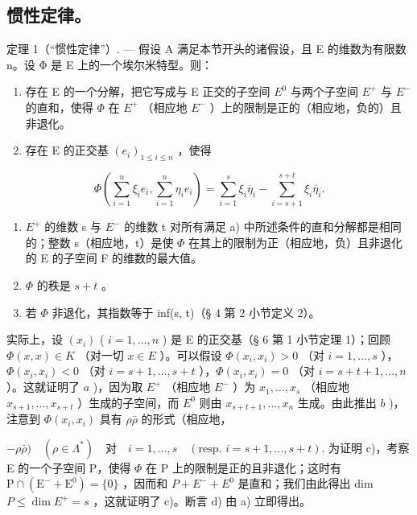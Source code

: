 \subsection{惯性定律。}

定理 1（“惯性定律”）. --- 假设 A 满足本节开头的诸假设，且 E 的维数为有限数 n。设 Φ 是 E 上的一个埃尔米特型。则：

\begin{enumerate}
\def\labelenumi{\alph{enumi})}
\item
  存在 E 的一个分解，把它写成与 E 正交的子空间 \(E^{0}\) 与两个子空间 \(E^{+}\) 与 \(E^{-}\) 的直和，使得 \(\Phi\) 在 \(E^{+}\) （相应地 \(E^{-}\) ）上的限制是正的（相应地，负的）且非退化。
\item
  存在 E 的正交基 \((e_i)_{1\leqslant i\leqslant n}\) ，使得
\end{enumerate}

\[
\Phi (\sum_ {i = 1} ^ {n} \xi_ {i} e _ {i}, \sum_ {i = 1} ^ {n} \eta_ {i} e _ {i}) = \sum_ {i = 1} ^ {s} \xi_ {i} \overline {{\eta}} _ {i} - \sum_ {i = s + 1} ^ {s + t} \xi_ {i} \overline {{\eta}} _ {i}.\tag{2}
\]

\begin{enumerate}
\def\labelenumi{\alph{enumi})}
\setcounter{enumi}{2}
\item
  \(E^{+}\) 的维数 s 与 \(E^{-}\) 的维数 t 对所有满足 a) 中所述条件的直和分解都是相同的；整数 s（相应地，t）是使 \(\Phi\) 在其上的限制为正（相应地，负）且非退化的 E 的子空间 F 的维数的最大值。
\item
  \(\Phi\) 的秩是 \(s + t\) 。
\item
  若 \(\Phi\) 非退化，其指数等于 inf(s, t)（§ 4 第 2 小节定义 2）。
\end{enumerate}

实际上，设 \((x_{i})\) ( \(i = 1, \ldots, n\) ) 是 E 的正交基（§ 6 第 1 小节定理 1）；回顾 \(\Phi(x, x) \in K\) （对一切 \(x \in E\) ）。可以假设 \(\Phi(x_{i}, x_{i}) > 0\) （对 \(i = 1, \ldots, s\) ），\(\Phi(x_{i}, x_{i}) < 0\) （对 \(i = s + 1, \ldots, s + t\) ），\(\Phi(x_{i}, x_{i}) = 0\) （对 \(i = s + t + 1, \ldots, n\) ）。这就证明了 \(a\) )，因为取 \(E^{+}\) （相应地 \(E^{-}\) ）为 \(x_{1}, \ldots, x_{s}\) （相应地 \(x_{s+1}, \ldots, x_{s+t}\) ）生成的子空间，而 \(E^{0}\) 则由 \(x_{s+t+1}, \ldots, x_{n}\) 生成。由此推出 \(b\) )，注意到 \(\Phi(x_{i}, x_{i})\) 具有 \(\rho\bar{\rho}\) 的形式（相应地，

\(-\rho\bar{\rho}) \quad (\rho\in\Lambda^{*}) \quad \text{对} \quad i=1,\ldots,s \quad (\text{resp. } i=s+1,\ldots,s+t).\) 为证明 c)，考察 E 的一个子空间 P，使得 \(\Phi\) 在 P 上的限制是正的且非退化；这时有 \(\mathrm{P}\cap(\mathrm{E}^{-}+\mathrm{E}^{0})=\{0\}\) ，因而和 \(P+E^{-}+E^{0}\) 是直和；我们由此得出 dim \(P\leqslant\dim E^{+}=s\) ，这就证明了 c)。断言 d) 由 a) 立即得出。

